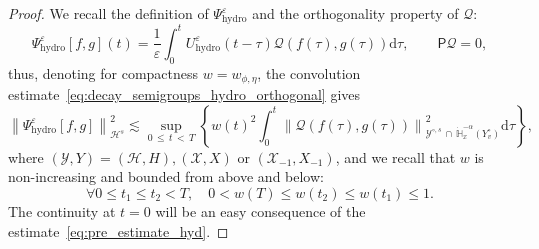 \documentclass[AHL,Unicode,longabstracts,published]{cedram}
\newcommand{\hyd}{\mathrm{hydro}}
\renewcommand{\d}{\mathrm{d}}
\newcommand{\bbH}{\mathbb{H}}
\newcommand{\XX}{\mathcal{X}}
\newcommand{\HH}{\mathcal{H}}
\newcommand{\PP}{\mathsf{P}}
\newcommand{\QQ}{\mathcal{Q}}
\newcommand{\VV}{\mathcal{Y}}
\newcommand{\HHH}{\mathscr{H}}
\newcommand{\Ss}{H}
\newcommand{\SSs}{\HH}
\newcommand{\rSSSs}[1]{\HHH^{#1}}
\newcommand{\Sl}{X}
\newcommand{\SSl}{\XX}
\newcommand{\Sg}{Y}
\newcommand{\Sgm}{Y^{\circ}}
\newcommand{\SSg}{\VV}
\newcommand{\rSSgm}[1]{\VV^{\circ, #1}}
\renewcommand*\le{\leqslant}
\renewcommand*\leq{\leqslant}
\newcommand*\eps{{\varepsilon}}
\let\oldforall\forall
\renewcommand*{\forall}{\mathrel{\oldforall}}
\begin{document}
\begin{proof}
We recall the definition of $\Psi^\eps_\hyd$ and the orthogonality property of $\QQ$:
\[
\Psi^\eps_\hyd [f, g](t) = \frac{1}{\eps} \int_0^t U^\eps_\hyd(t-\tau) \QQ(f(\tau), g(\tau)) \d \tau, \qquad \PP \QQ = 0,
\]
thus, denoting for compactness $w = w_{\phi, \eta}$, the convolution estimate~\eqref{eq:decay_semigroups_hydro_orthogonal} gives
\begin{equation}\label{eq:pre_estimate_hyd}
\left\| \Psi^\eps_\hyd [f, g] \right\|_{\rSSSs{s}}^2 \lesssim \sup_{0\,\le\,t\,<\,T} \left\{w(t)^2 \int_0^t \left\| \QQ(f(\tau), g(\tau)) \right\|_{ \rSSgm{s}\,\cap\,\dot{\bbH}^{-\alpha}_x \left(\Sgm_v \right) }^2 \d \tau\right\},
\end{equation}
where $(\SSg, \Sg) = (\SSs, \Ss), (\SSl, \Sl)$ or $(\SSl_{-1}, \Sl_{-1})$, and we recall that $w$ is non-increasing and bounded from above and below:
\begin{equation}\label{eq:bound_w}
\forall 0 \leq t_1 \le t_2 < T, \quad 0 < w(T) \le w(t_2) \le w(t_1) \le 1.
\end{equation}
The continuity at $t = 0$ will be an easy consequence of the estimate~\eqref{eq:pre_estimate_hyd}.


\end{proof}
\end{document}
